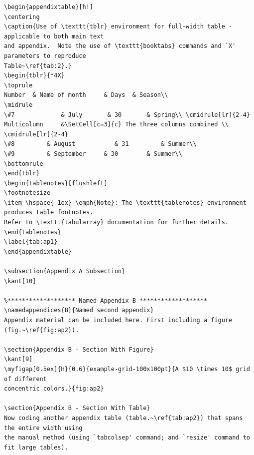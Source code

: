 \documentclass{article}
\begin{document}
\begin{verbatim}
\begin{appendixtable}[h!]
\centering
\caption{Use of \texttt{tblr} environment for full-width table - applicable to both main text 
and appendix.  Note the use of \texttt{booktabs} commands and `X' parameters to reproduce 
Table~\ref{tab:2}.}
\begin{tblr}{*4X}
\toprule
Number 	& Name of month 	& Days 	& Season\\
\midrule
\#7 			& July       & 30 		& Spring\\ \cmidrule[lr]{2-4}
Multicolumn 	&\SetCell[c=3]{c} The three columns combined \\ \cmidrule[lr]{2-4}
\#8 		& August 		   & 31 		& Summer\\
\#9 		& September 	& 30 		& Summer\\
\bottomrule
\end{tblr}
\begin{tablenotes}[flushleft]
\footnotesize
\item \hspace{-1ex} \emph{Note}: The \texttt{tablenotes} environment produces table footnotes.  
Refer to \texttt{tabularray} documentation for further details.  
\end{tablenotes}
\label{tab:ap1}
\end{appendixtable}

\subsection{Appendix A Subsection}
\kant[10]

%******************* Named Appendix B *******************
\namedappendices{B}{Named second appendix}
Appendix material can be included here. First including a figure (fig.~\ref{fig:ap2}).

\section{Appendix B - Section With Figure}
\kant[9]
\myfigap[0.5ex]{H}{0.6}{example-grid-100x100pt}{A $10 \times 10$ grid of different
concentric colors.}{fig:ap2}

\section{Appendix B - Section With Table}
Now coding another appendix table (table.~\ref{tab:ap2}) that spans the entire width using
the manual method (using `tabcolsep' command; and `resize' command to fit large tables).


\end{verbatim}
\end{document}
